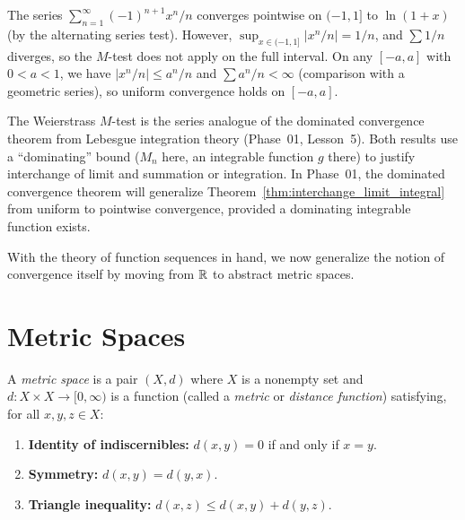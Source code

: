 \documentclass[11pt,a4paper]{article}
\begin{document}
\begin{example}
\label{ex:m_test_fails}
The series $\sum_{n=1}^\infty (-1)^{n+1} x^n / n$ converges pointwise
on $(-1, 1]$ to $\ln(1 + x)$ (by the alternating series test). However,
$\sup_{x \in (-1, 1]} |x^n / n| = 1/n$, and $\sum 1/n$ diverges, so
the $M$-test does not apply on the full interval. On any $[-a, a]$ with
$0 < a < 1$, we have $|x^n/n| \le a^n/n$ and $\sum a^n/n < \infty$
(comparison with a geometric series), so uniform convergence holds on
$[-a, a]$.
\end{example}

\begin{keyresult}[title={Connection to dominated convergence}]
The Weierstrass $M$-test is the series analogue of the dominated
convergence theorem from Lebesgue integration theory (Phase~01,
Lesson~5). Both results use a ``dominating'' bound ($M_n$ here, an
integrable function $g$ there) to justify interchange of limit and
summation or integration. In Phase~01, the dominated convergence theorem
will generalize Theorem~\ref{thm:interchange_limit_integral} from
uniform to pointwise convergence, provided a dominating integrable
function exists.
\end{keyresult}

With the theory of function sequences in hand, we now generalize the
notion of convergence itself by moving from $\mathbb{R}$ to abstract metric
spaces.

\section{Metric Spaces}
\label{sec:metric_spaces}

\begin{definition}
\label{def:metric_space}
A \emph{metric space} is a pair $(X, d)$ where $X$ is a nonempty set
and $d \colon X \times X \to [0, \infty)$ is a function (called a
\emph{metric} or \emph{distance function}) satisfying, for all
$x, y, z \in X$:
\begin{enumerate}[nosep,label=(\roman*)]
  \item \textbf{Identity of indiscernibles:} $d(x, y) = 0$ if and only
    if $x = y$.
  \item \textbf{Symmetry:} $d(x, y) = d(y, x)$.
  \item \textbf{Triangle inequality:} $d(x, z) \le d(x, y) + d(y, z)$.
\end{enumerate}
\end{definition}
\end{document}
